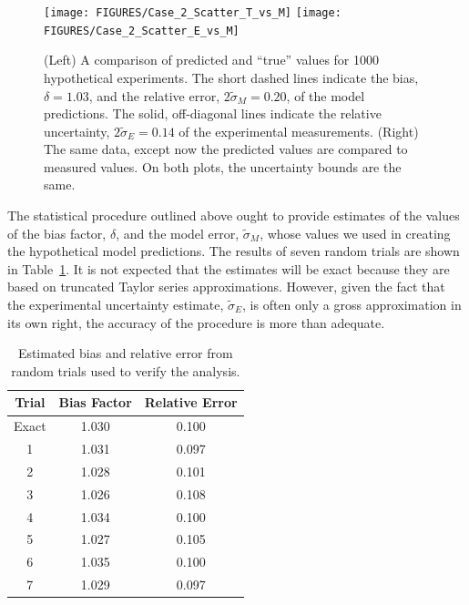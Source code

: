 \begin{figure}[t]
\begin{center}
\texttt{[image: FIGURES/Case\_2\_Scatter\_T\_vs\_M]}
\texttt{[image: FIGURES/Case\_2\_Scatter\_E\_vs\_M]}
\end{center}
\caption[Verification of the model error calculation, Case 2.]{(Left) A comparison of predicted and ``true'' values for 1000 hypothetical
experiments. The short dashed lines indicate the bias, $\delta=1.03$, and the relative error, $2\widetilde{\sigma}_M=0.20$, of the model predictions.
The solid, off-diagonal lines indicate the relative uncertainty, $2\widetilde{\sigma}_E=0.14$ of the experimental measurements.
(Right) The same data, except now the predicted values are compared to measured values. On both plots, the uncertainty bounds are the same.}
\label{Case_2_Scatter}
\end{figure}

The statistical procedure outlined above ought to provide estimates of the values of the bias factor, $\delta$, and the model error, $\widetilde{\sigma}_M$, whose
values we used in creating the hypothetical model predictions. The results of seven random trials are shown in Table~\ref{trials}. It is not expected that the
estimates will be exact because they are based on truncated Taylor series approximations. However, given the fact that the experimental uncertainty estimate,
$\widetilde{\sigma}_E$, is often only a gross approximation in its own right, the accuracy of the procedure is more than adequate.

\begin{table}[t]
\caption{Estimated bias and relative error from random trials used to verify the analysis. }
\begin{center}
\begin{tabular}{|c|c|c|}
\hline
Trial   & Bias Factor      & Relative Error \\ \hline \hline
Exact   & 1.030            &    0.100            \\ \hline \hline
1       & 1.031            &    0.097            \\ \hline
2       & 1.028            &    0.101            \\ \hline
3       & 1.026            &    0.108            \\ \hline
4       & 1.034            &    0.100            \\ \hline
5       & 1.027            &    0.105            \\ \hline
6       & 1.035            &    0.100            \\ \hline
7       & 1.029            &    0.097            \\ \hline
\end{tabular}
\end{center}
\label{trials}
\end{table}





